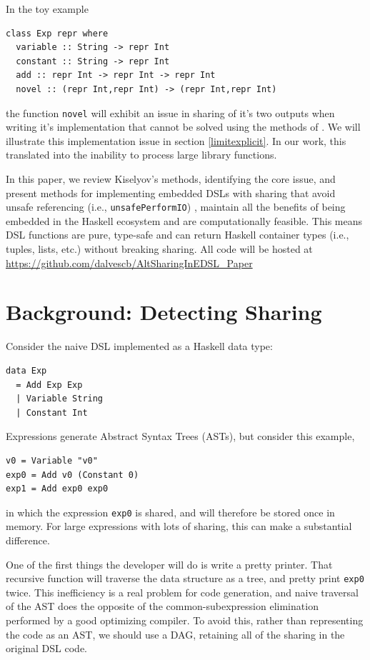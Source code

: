 \documentclass[runningheads]{llncs}
\begin{document}
In the toy example
\begin{verbatim}
class Exp repr where
  variable :: String -> repr Int
  constant :: String -> repr Int
  add :: repr Int -> repr Int -> repr Int
  novel :: (repr Int,repr Int) -> (repr Int,repr Int)
\end{verbatim}
the function \texttt{novel} will exhibit an issue in sharing of
it's two outputs when writing it's implementation that cannot be solved using
the methods of \cite{kiselyov:sharing}. We will illustrate this implementation
issue in section \ref{limitexplicit}. In our work, this translated into the
inability to process large library functions.

\smallskip
In this paper, we review Kiselyov's methods, identifying the core issue, and
present methods for implementing embedded DSLs with sharing that avoid  unsafe referencing (i.e., \texttt{unsafePerformIO}) \cite{gill:observablesharing}, maintain all the benefits of being embedded in the Haskell ecosystem and are computationally feasible. This
means DSL functions are pure, type-safe and can return Haskell container types (i.e.,
tuples, lists, etc.) without breaking sharing. All code will be hosted at \url{https://github.com/dalvescb/AltSharingInEDSL_Paper}

\section{Background: Detecting Sharing}

Consider the naive DSL implemented as a Haskell data type:
\begin{verbatim}
data Exp
  = Add Exp Exp
  | Variable String
  | Constant Int
\end{verbatim}
Expressions generate Abstract Syntax Trees (ASTs),
but consider this example,
\begin{verbatim}
v0 = Variable "v0"
exp0 = Add v0 (Constant 0)
exp1 = Add exp0 exp0
\end{verbatim}
in which the expression  \texttt{exp0} is shared,
and will therefore be stored once in memory.
For large expressions with lots of sharing,
this can make a substantial difference.

One of the first things the developer will do is write a pretty printer.
That recursive function will traverse the data structure as a tree,
and pretty print \texttt{exp0} twice.
This inefficiency is a real problem for code generation,
and naive traversal of the AST does the opposite of the common-subexpression elimination performed by a good optimizing compiler.
To avoid this,
rather than representing the code as an AST, 
we should use a DAG, retaining all of the sharing in the original DSL code. 
\end{document}
